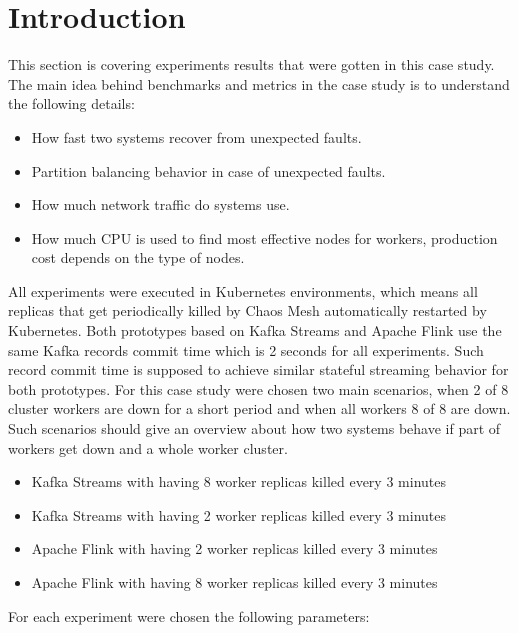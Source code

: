 \section{Introduction}\label{sec:introduction-results}
This section is covering experiments results that were gotten in this case study.
The main idea behind benchmarks and metrics in the case study is to understand
the following details:

\begin{itemize}
    \item How fast two systems recover from unexpected faults.
    \item Partition balancing behavior in case of unexpected faults.
    \item How much network traffic do systems use.
    \item How much CPU is used to find most effective nodes for workers, production cost depends on the type of nodes.
\end{itemize}

All experiments were executed in Kubernetes environments, which means all replicas that
get periodically killed by Chaos Mesh automatically restarted by Kubernetes.
Both prototypes based on Kafka Streams and Apache Flink use the same Kafka records
commit time which is 2 seconds for all experiments.
Such record commit time is supposed to achieve similar stateful streaming behavior
for both prototypes.
For this case study were chosen two main scenarios, when 2 of 8 cluster workers are down for
a short period and when all workers 8 of 8 are down.
Such scenarios should give an overview about how two systems behave if part of workers
get down and a whole worker cluster.


\begin{itemize}
    \item Kafka Streams with having 8 worker replicas killed every 3 minutes
    \item Kafka Streams with having 2 worker replicas killed every 3 minutes
    \item Apache Flink with having 2 worker replicas killed every 3 minutes
    \item Apache Flink with having 8 worker replicas killed every 3 minutes
\end{itemize}

For each experiment were chosen the following parameters:

